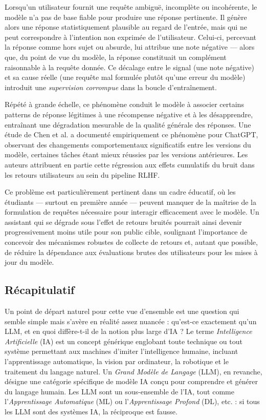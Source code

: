 \documentclass[a4paper,11pt]{article}
\begin{document}
Lorsqu'un utilisateur fournit une requête ambiguë, incomplète ou incohérente,
le modèle n'a pas de base fiable pour produire une réponse pertinente. Il
génère alors une réponse statistiquement plausible au regard de l'entrée,
mais qui ne peut correspondre à l'intention non exprimée de l'utilisateur.
Celui-ci, percevant la réponse comme hors sujet ou absurde, lui attribue
une note négative --- alors que, du point de vue du modèle, la réponse
constituait un complément raisonnable à la requête donnée. Ce décalage entre
le signal (une note négative) et sa cause réelle (une requête mal formulée
plutôt qu'une erreur du modèle) introduit une \emph{supervision corrompue}
dans la boucle d'entraînement.

Répété à grande échelle, ce phénomène conduit le modèle à associer certains
patterns de réponse légitimes à une récompense négative et à les désapprendre,
entraînant une dégradation mesurable de la qualité générale des réponses.
Une étude de Chen et al. \cite{chen2023chatgpt} a documenté empiriquement
ce phénomène pour ChatGPT, observant des changements comportementaux
significatifs entre les versions du modèle, certaines tâches étant mieux
réussies par les versions antérieures. Les auteurs attribuent en partie cette
régression aux effets cumulatifs du bruit dans les retours utilisateurs au
sein du pipeline RLHF.

Ce problème est particulièrement pertinent dans un cadre éducatif, où les
étudiants --- surtout en première année --- peuvent manquer de la maîtrise
de la formulation de requêtes nécessaire pour interagir efficacement avec
le modèle. Un assistant qui se dégrade sous l'effet de retours bruités
pourrait ainsi devenir progressivement moins utile pour son public cible,
soulignant l'importance de concevoir des mécanismes robustes de collecte
de retours et, autant que possible, de réduire la dépendance aux évaluations
brutes des utilisateurs pour les mises à jour du modèle.

\subsection{Récapitulatif}

Un point de départ naturel pour cette vue d'ensemble est une question qui
semble simple mais s'avère en réalité assez nuancée : qu'est-ce exactement
qu'un LLM, et en quoi diffère-t-il de la notion plus large d'\og IA \fg{} ?
Le terme \emph{Intelligence Artificielle} (IA) est un concept générique
englobant toute technique ou tout système permettant aux machines d'imiter
l'intelligence humaine, incluant l'apprentissage automatique, la vision par
ordinateur, la robotique et le traitement du langage naturel. Un
\emph{Grand Modèle de Langage} (LLM), en revanche, désigne une catégorie
spécifique de modèle IA conçu pour comprendre et générer du langage humain.
Les LLM sont un sous-ensemble de l'IA, tout comme l'\emph{Apprentissage
Automatique} (ML) ou l'\emph{Apprentissage Profond} (DL), etc. : si tous
les LLM sont des systèmes IA, la réciproque est fausse.
\end{document}
